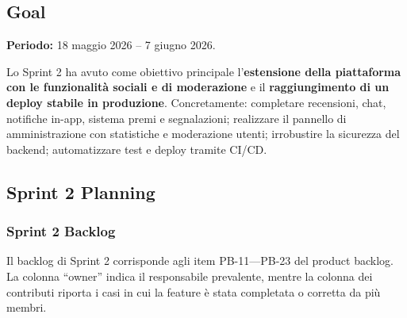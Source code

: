 \documentclass[11pt,a4paper]{article}
\begin{document}
\subsection{Goal}

\textbf{Periodo:} 18 maggio 2026 -- 7 giugno 2026.

Lo Sprint 2 ha avuto come obiettivo principale l'\textbf{estensione della piattaforma con le funzionalità sociali e di moderazione} e il \textbf{raggiungimento di un deploy stabile in produzione}. Concretamente: completare recensioni, chat, notifiche in-app, sistema premi e segnalazioni; realizzare il pannello di amministrazione con statistiche e moderazione utenti; irrobustire la sicurezza del backend; automatizzare test e deploy tramite CI/CD.

\subsection{Sprint 2 Planning}

\subsubsection*{Sprint 2 Backlog}

Il backlog di Sprint 2 corrisponde agli item PB-11---PB-23 del product backlog. La colonna ``owner'' indica il responsabile prevalente, mentre la colonna dei contributi riporta i casi in cui la feature è stata completata o corretta da più membri.
\end{document}
